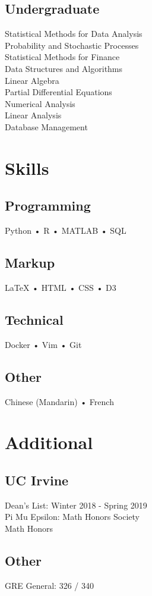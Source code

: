 \documentclass[]{deedy-resume-openfont}
\begin{document}
\begin{minipage}[t]{0.33\textwidth}
\subsection{Undergraduate} 
Statistical Methods for Data Analysis \\
Probability and Stochastic Processes \\
Statistical Methods for Finance \\
Data Structures and Algorithms  \\
Linear Algebra \\
Partial Differential Equations \\
Numerical Analysis \\
Linear Analysis \\
Database Management \\
\sectionsep


\section{Skills}
\subsection{Programming}
Python • R • MATLAB • SQL 
\subsection{Markup}
{\LaTeX} • HTML • CSS • D3
\subsection{Technical}
Docker • Vim • Git
\subsection{Other}
Chinese (Mandarin) • French
\sectionsep


\section{Additional}
\subsection{UC Irvine}
Dean's List: Winter 2018 - Spring 2019 \\
Pi Mu Epsilon: Math Honors Society \\
Math Honors
\subsection{Other}
GRE General: 326 / 340 
\sectionsep


\end{minipage}
\end{document}
